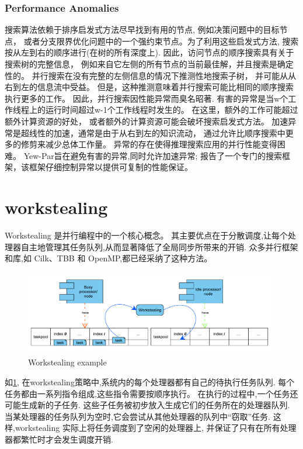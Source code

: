 \documentclass{mproj}
\begin{document}
\subsubsection{Performance Anomalies}
\label{sec:performance_anomalies}
搜索算法依赖于排序启发式方法尽早找到有用的节点,
例如决策问题中的目标节点，
或者分支限界优化问题中的一个强约束节点。为了利用这些启发式方法,
搜索按从左到右的顺序进行(在树的所有深度上).
因此，访问节点的顺序搜索具有关于搜索树的完整信息，
例如来自它左侧的所有节点的当前最佳解，并且搜索是确定性的。
并行搜索在没有完整的左侧信息的情况下推测性地搜索子树，
并可能从从右到左的信息流中受益。
但是，这种推测意味着并行搜索可能比相同的顺序搜索执行更多的工作。
因此，并行搜索因性能异常而臭名昭著\cite{10.1007/3-540-60321-2_29}.
有害的异常是当w个工作线程上的运行时间超过w-1个工作线程时发生的。
在这里，额外的工作可能超过额外计算资源的好处，
或者额外的计算资源可能会破坏搜索启发式方法。
加速异常是超线性的加速，通常是由于从右到左的知识流动，
通过允许比顺序搜索中更多的修剪来减少总体工作量。
异常的存在使得推理搜索应用的并行性能变得困难。
Yew-Par旨在避免有害的异常,同时允许加速异常;
\cite{ARCHIBALD201892}报告了一个专门的搜索框架，该框架仔细控制异常以提供可复制的性能保证。

\section{workstealing}
Workstealing 是并行编程中的一个核心概念。
其主要优点在于分散调度,让每个处理器自主地管理其任务队列,从而显著降低了全局同步所带来的开销.
众多并行框架和库,如 Cilk、TBB 和 OpenMP,都已经采纳了这种方法。

\begin{figure}[h]
    \centering %
    \includegraphics[width=0.98\textwidth]{images/workstealing.pdf} %
    \caption{Workstealing example} %
    \label{fig:workstealing} %
\end{figure}
\FloatBarrier

如\cref{fig:workstealing},
在workstealing策略中,系统内的每个处理器都有自己的待执行任务队列.
每个任务都由一系列指令组成,这些指令需要按顺序执行。
在执行的过程中,一个任务还可能生成新的子任务.
这些子任务被初步放入生成它们的任务所在的处理器队列.
当某处理器的任务队列为空时,它会尝试从其他处理器的队列中“窃取”任务.
这样,workstealing 实际上将任务调度到了空闲的处理器上,
并保证了只有在所有处理器都繁忙时才会发生调度开销.\cite{10.1145/1248377.1248396}
\end{document}
